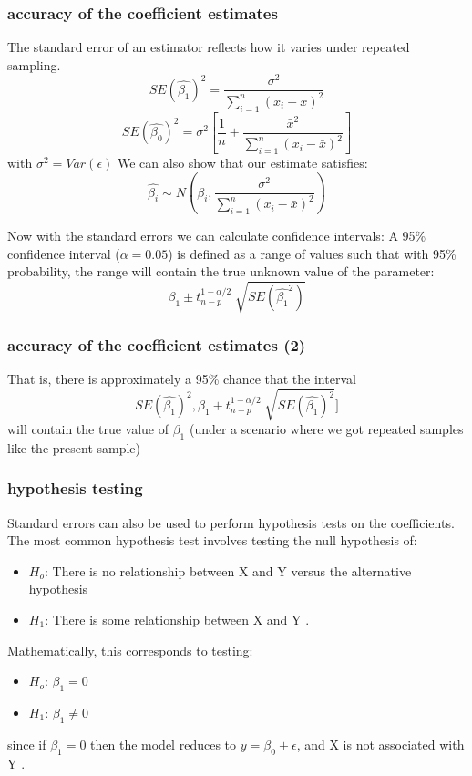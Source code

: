 \documentclass{beamer}
\begin{document}
\begin{frame}
\frametitle{accuracy of the coefficient estimates}
The standard error of an estimator reflects how it varies
under repeated sampling.
\begin{equation*}
SE(\hat{\beta_1})^2 = \frac{\sigma^2}{\sum_{i = 1}^n (x_i - \bar{x})^2}
\end{equation*}
\begin{equation*}
SE(\hat{\beta_0})^2 =\sigma^2 [\frac{1}{n} +\frac{\bar{x}^2}{\sum_{i = 1}^n (x_i - \bar{x})^2}]
\end{equation*}
with $\sigma^2 = Var(\epsilon)$
\newline
We can also show that our estimate satisfies:
\begin{equation*}
\hat{ \beta_i } \sim N(\beta_i,  \frac{\sigma^2}{\sum_{i = 1}^n (x_i - \bar{x})^2})
\end{equation*}

Now with the standard errors we can calculate confidence intervals: A 95\% confidence interval ($\alpha = 0.05$) is defined as a range of
values such that with 95\% probability, the range will
contain the true unknown value of the parameter:
\begin{equation*}
\beta_1 \pm t_{n-p}^{1-\alpha/2} \sqrt[]{SE(\hat{\beta_1}^2) }
\end{equation*}
\end{frame}


\begin{frame}
\frametitle{accuracy of the coefficient estimates (2)}
That is, there is approximately a 95\% chance that the interval
\begin{equation*}
[\beta_1 - t_{n-p}^{1-\alpha/2}\sqrt[]{SE(\hat{\beta_1})^2}, \beta_1 + t_{n-p}^{1-\alpha/2} \sqrt[]{SE(\hat{\beta_1})^2} ]
\end{equation*}
will contain the true value of $\beta_1$ (under a scenario where we got
repeated samples like the present sample)
\end{frame}

\begin{frame}
\frametitle{hypothesis testing}
Standard errors can also be used to perform hypothesis
tests on the coefficients. The most common hypothesis test
involves testing the null hypothesis of:
\begin{itemize}
\item $H_o$: There is no relationship between X and Y
versus the alternative hypothesis
\item $H_1$: There is some relationship between X and Y .
\end{itemize}

Mathematically, this corresponds to testing:
\begin{itemize}
\item $H_o$: $\beta_1 = 0$
\item $H_1$: $\beta_1 \neq 0 $
\end{itemize}
since if $\beta_1 = 0$ then the model reduces to $y = \beta_0 + \epsilon$, and
X is not associated with Y .
\end{frame}
\end{document}
